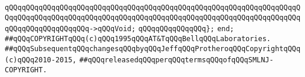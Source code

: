 \verb|qQQqqQQqqQQqqQQqqQQqqQQqqQQqqQQqqQQqqQQqqQQqqQQqqQQqqQQqqQQqqQQqqQQqqQQqqQQqqQQqqQQqqQQqqQQqqQQqqQQqqQQqqQQqqQQqqQQqqQQqqQQqqQQqqQQqqQQqqQQqqQQqqQQqqQQqqQQqqQQq->qQQqVoid;|\newline
\verb|qQQqqQQqqQQqqQQq};|\newline
\verb|end;|\newline
\newline
\newline
\verb|##qQQqCOPYRIGHTqQQq(c)qQQq1995qQQqAT&TqQQqBellqQQqLaboratories.|\newline
\verb|##qQQqSubsequentqQQqchangesqQQqbyqQQqJeffqQQqProtheroqQQqCopyrightqQQq(c)qQQq2010-2015,|\newline
\verb|##qQQqreleasedqQQqperqQQqtermsqQQqofqQQqSMLNJ-COPYRIGHT.|\newline

